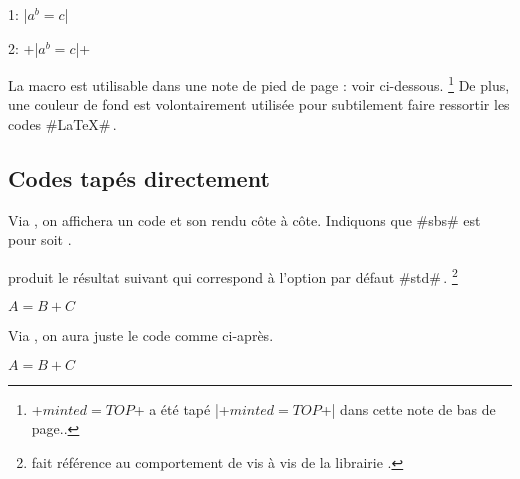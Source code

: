 \begin{tdoclatex}[sbs]
    1: \tdocinlatex|$a^b = c$|

    2: \tdocinlatex+\tdocinlatex|$a^b = c$|+
\end{tdoclatex}


\begin{tdocnote}
    La macro  est utilisable dans une note de pied de page : voir ci-dessous.
    \footnote{
        \tdocinlatex+$minted = TOP$+ a été tapé \tdocinlatex|\tdocinlatex+$minted = TOP$+| dans cette note de bas de page..
    }
    De plus, une couleur de fond est volontairement utilisée pour subtilement faire ressortir les codes \tdocinlatex#\LaTeX#\,.
\end{tdocnote}



\subsection{Codes tapés directement}

\begin{tdocexa}
    Via , on affichera un code et son rendu côte à côte.
    Indiquons que \tdocinlatex#sbs# est pour  soit .

\end{tdocexa}




\begin{tdocexa}[À la suite]
     produit le résultat suivant qui correspond à l'option par défaut \tdocinlatex#std#\,.
    \footnote{
         fait référence au comportement  de  vis à vis de la librairie .
    }

    \begin{tdoclatex}
        $A = B + C$
    \end{tdoclatex}
\end{tdocexa}




\begin{tdocexa}
    Via , on aura juste le code comme ci-après.

    \begin{tdoclatex}[code]
        $A = B + C$
    \end{tdoclatex}
\end{tdocexa}


